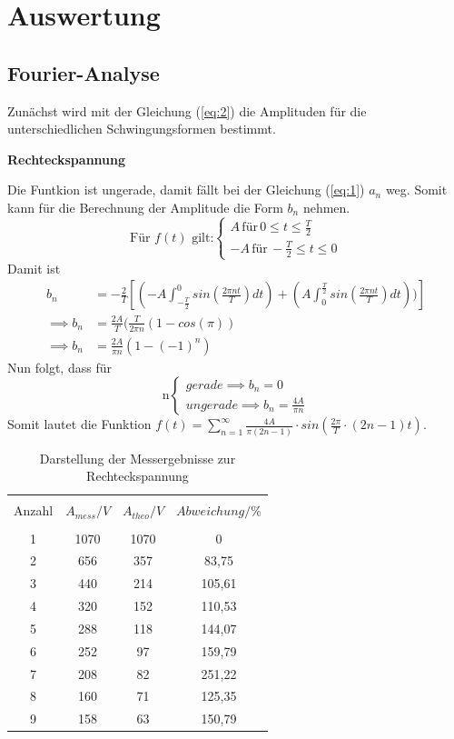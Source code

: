 \section{Auswertung}
\subsection{Fourier-Analyse}
Zunächst wird mit der Gleichung (\ref{eq:2}) die Amplituden für die unterschiedlichen
Schwingungsformen bestimmt.\\
\centerline{\textbf{Rechteckspannung}}
Die Funtkion ist ungerade, damit fällt bei der Gleichung (\ref{eq:1}) $a_n$ weg.
Somit kann für die Berechnung der Amplitude die Form $b_n$ nehmen.
\begin{equation*}
  \text{Für $f(t)$ gilt:}
  \begin{cases}
    A \, \text{für} \, 0 \leq t \leq \frac{T}{2} \\
    -A \, \text{für} \, -\frac{T}{2} \leq t \leq 0
  \end{cases}
\end{equation*}
Damit ist
\begin{align*}
  b_n &= -\frac{2}{T} [(-A \int_{-\frac{T}{2}}^0 sin(\frac{2\pi nt}{T})dt) + (A \int_0^{\frac{T}{2}} sin(\frac{2\pi nt}{T})dt))]\\
\implies b_n &=\frac{2A}{T} (\frac{T}{2\pi n}(1-cos(\pi))\\
\implies b_n &= \frac{2A}{\pi n}(1-(-1)^n)
\end{align*}
Nun folgt, dass für
\begin{equation*}
  \text{n}
  \begin{cases}
    gerade \implies b_n = 0 \,\, \\
    ungerade \implies b_n = \frac{4A}{\pi n}
  \end{cases}
\end{equation*}
Somit lautet die Funktion $f(t) = \sum^{\infty}_{n=1} \frac{4A}{\pi (2n-1)} \cdot sin(\frac{2\pi}{T}\cdot(2n-1)t)$.
\begin{table}[H]
  \centering
  \begin{tabular}{c c c c}
    \toprule\\
    Anzahl & $A_{mess} / V$ & $A_{theo} / V$ & $Abweichung / \% $\\
    \midrule \\
    1 & 1070 & 1070 & 0 \\
    2 & 656  & 357 & 83,75 \\
    3 & 440  & 214 & 105,61 \\
    4 & 320  & 152 & 110,53 \\
    5 & 288  & 118 & 144,07 \\
    6 & 252  & 97 & 159,79  \\
    7 & 208  & 82 & 251,22  \\
    8 & 160  & 71 & 125,35  \\
    9 & 158  & 63 & 150,79  \\
    \bottomrule
  \end{tabular}
  \caption{Darstellung der Messergebnisse zur Rechteckspannung}
  \label{tab:1}
\end{table}
